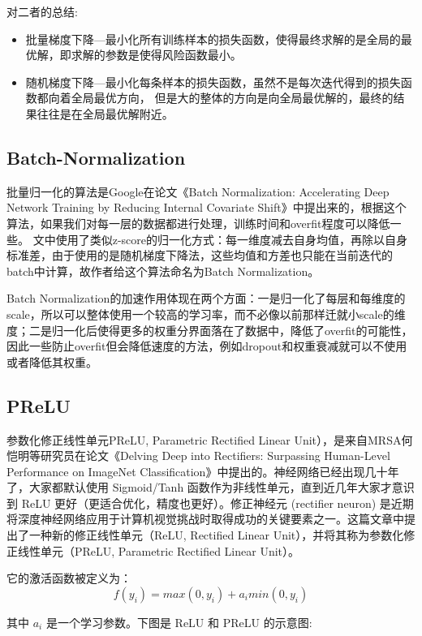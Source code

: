 对二者的总结:

\begin{itemize}
\item 批量梯度下降---最小化所有训练样本的损失函数，使得最终求解的是全局的最优解，即求解的参数是使得风险函数最小。
\item 随机梯度下降---最小化每条样本的损失函数，虽然不是每次迭代得到的损失函数都向着全局最优方向， 但是大的整体的方向是向全局最优解的，最终的结果往往是在全局最优解附近。
\end{itemize}

\subsection{Batch-Normalization\cite{DBLP}}
批量归一化的算法是Google在论文《Batch Normalization: Accelerating Deep Network Training by Reducing Internal Covariate Shift》中提出来的，根据这个算法，如果我们对每一层的数据都进行处理，训练时间和overfit程度可以降低一些。 文中使用了类似z-score的归一化方式：每一维度减去自身均值，再除以自身标准差，由于使用的是随机梯度下降法，这些均值和方差也只能在当前迭代的batch中计算，故作者给这个算法命名为Batch Normalization。

Batch Normalization的加速作用体现在两个方面：一是归一化了每层和每维度的scale，所以可以整体使用一个较高的学习率，而不必像以前那样迁就小scale的维度；二是归一化后使得更多的权重分界面落在了数据中，降低了overfit的可能性，因此一些防止overfit但会降低速度的方法，例如dropout和权重衰减就可以不使用或者降低其权重。

\subsection{PReLU}
参数化修正线性单元PReLU, Parametric Rectified Linear Unit），是来自MRSA何恺明等研究员在论文《Delving Deep into Rectifiers: Surpassing Human-Level Performance on ImageNet Classification》中提出的。神经网络已经出现几十年了，大家都默认使用 Sigmoid/Tanh 函数作为非线性单元，直到近几年大家才意识到 ReLU 更好（更适合优化，精度也更好）。修正神经元 (rectifier neuron) 是近期将深度神经网络应用于计算机视觉挑战时取得成功的关键要素之一。这篇文章中提出了一种新的修正线性单元（ReLU, Rectified Linear Unit），并将其称为参数化修正线性单元（PReLU, Parametric Rectified Linear Unit）。

它的激活函数被定义为：
\begin{displaymath}
f(y_i) = max(0,y_i)+a_imin(0,y_i)
\end{displaymath}

其中 $a_i$ 是一个学习参数。下图是 ReLU 和 PReLU 的示意图:


